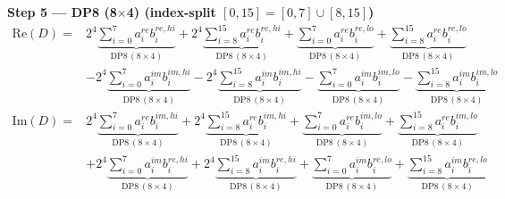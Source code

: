 \documentclass[fleqn]{article}
\newcommand{\DPop}[3]{\mathrm{DP#1}\,(#2\!\times\!#3)}
\begin{document}
\vspace{0.3em}

\noindent\textbf{Step 5 --- DP8 (8$\times$4) \quad (index-split $[0,15] = [0,7] \cup [8,15]$)}
\begin{align*}
\mathrm{Re}(D) = {}
  & 2^{4} \underbrace{\sum_{i=0}^{7} a_i^{re} b_i^{re,hi}}_{\DPop{8}{8}{4}}
  + 2^{4} \underbrace{\sum_{i=8}^{15} a_i^{re} b_i^{re,hi}}_{\DPop{8}{8}{4}}
  + \underbrace{\sum_{i=0}^{7} a_i^{re} b_i^{re,lo}}_{\DPop{8}{8}{4}}
  + \underbrace{\sum_{i=8}^{15} a_i^{re} b_i^{re,lo}}_{\DPop{8}{8}{4}} \\[1em]
  & - 2^{4} \underbrace{\sum_{i=0}^{7} a_i^{im} b_i^{im,hi}}_{\DPop{8}{8}{4}}
  - 2^{4} \underbrace{\sum_{i=8}^{15} a_i^{im} b_i^{im,hi}}_{\DPop{8}{8}{4}}
  - \underbrace{\sum_{i=0}^{7} a_i^{im} b_i^{im,lo}}_{\DPop{8}{8}{4}}
  - \underbrace{\sum_{i=8}^{15} a_i^{im} b_i^{im,lo}}_{\DPop{8}{8}{4}}
\end{align*}
\begin{align*}
\mathrm{Im}(D) = {}
  & 2^{4} \underbrace{\sum_{i=0}^{7} a_i^{re} b_i^{im,hi}}_{\DPop{8}{8}{4}}
  + 2^{4} \underbrace{\sum_{i=8}^{15} a_i^{re} b_i^{im,hi}}_{\DPop{8}{8}{4}}
  + \underbrace{\sum_{i=0}^{7} a_i^{re} b_i^{im,lo}}_{\DPop{8}{8}{4}}
  + \underbrace{\sum_{i=8}^{15} a_i^{re} b_i^{im,lo}}_{\DPop{8}{8}{4}} \\[1em]
  & + 2^{4} \underbrace{\sum_{i=0}^{7} a_i^{im} b_i^{re,hi}}_{\DPop{8}{8}{4}}
  + 2^{4} \underbrace{\sum_{i=8}^{15} a_i^{im} b_i^{re,hi}}_{\DPop{8}{8}{4}}
  + \underbrace{\sum_{i=0}^{7} a_i^{im} b_i^{re,lo}}_{\DPop{8}{8}{4}}
  + \underbrace{\sum_{i=8}^{15} a_i^{im} b_i^{re,lo}}_{\DPop{8}{8}{4}}
\end{align*}
\end{document}
